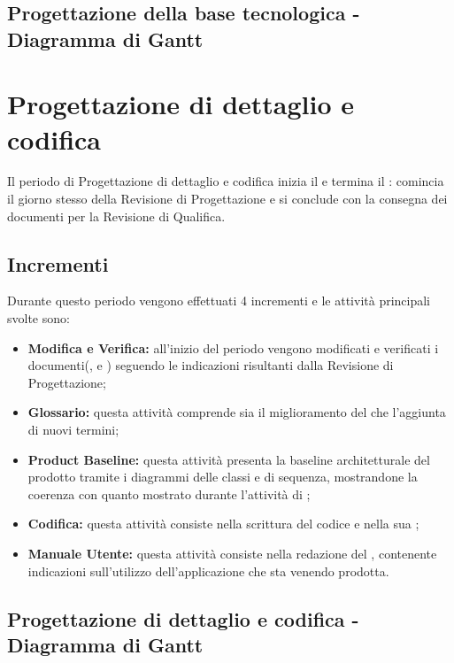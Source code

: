 \documentclass[PianoDiProgetto.tex]{subfiles}
\begin{document}
\begin{landscape}
	\subsection{Progettazione della base tecnologica - Diagramma di Gantt}
\end{landscape}


\section{Progettazione di dettaglio e codifica}
Il periodo di Progettazione di dettaglio e codifica inizia il  e termina il : comincia il giorno stesso della Revisione di Progettazione e si conclude con la consegna dei documenti per la Revisione di Qualifica.

\subsection{Incrementi}
Durante questo periodo vengono effettuati 4 incrementi e le attività principali svolte sono:
\begin{itemize}
	\item \textbf{Modifica e Verifica:} all'inizio del periodo vengono modificati e verificati i documenti(\ndp, \pdp e \pdq) seguendo le indicazioni risultanti dalla Revisione di Progettazione;
	\item \textbf{Glossario:} questa attività comprende sia il miglioramento del \g che l'aggiunta di nuovi termini;
	\item \textbf{Product Baseline:} questa attività presenta la baseline architetturale del prodotto tramite i diagrammi delle classi e di sequenza, mostrandone la coerenza con quanto mostrato durante l'attività di \tb;
	\item \textbf{Codifica:} questa attività consiste nella scrittura del codice e nella sua ;
	\item \textbf{Manuale Utente:} questa attività consiste nella redazione del \mut, contenente indicazioni sull'utilizzo dell'applicazione che sta venendo prodotta.

\end{itemize}
\begin{landscape}
		\subsection{Progettazione di dettaglio e codifica - Diagramma di Gantt}
\end{landscape}
\end{document}

